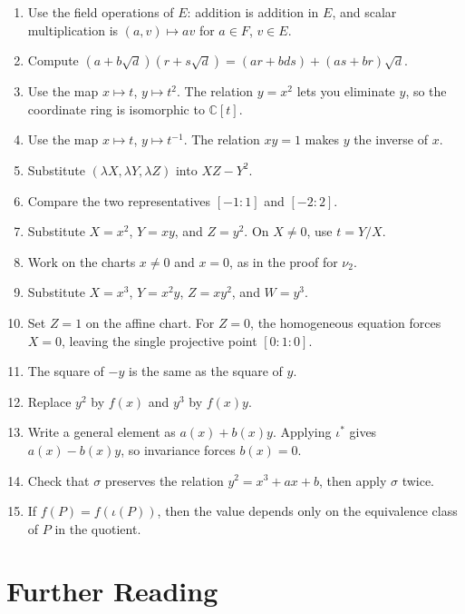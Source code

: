 \documentclass[11pt]{article}
\theoremstyle{definition}
\theoremstyle{remark}
\newcommand{\C}{\mathbb{C}}
\begin{document}
\begin{enumerate}
\item Use the field operations of \(E\): addition is addition in \(E\), and
scalar multiplication is \((a,v)\mapsto av\) for \(a\in F\), \(v\in E\).
\item Compute
\((a+b\sqrt d)(r+s\sqrt d)=(ar+bds)+(as+br)\sqrt d\).
\item Use the map \(x\mapsto t\), \(y\mapsto t^2\).  The relation
\(y=x^2\) lets you eliminate \(y\), so the coordinate ring is isomorphic to
\(\C[t]\).
\item Use the map \(x\mapsto t\), \(y\mapsto t^{-1}\).  The relation
\(xy=1\) makes \(y\) the inverse of \(x\).
\item Substitute \((\lambda X,\lambda Y,\lambda Z)\) into \(XZ-Y^2\).
\item Compare the two representatives \([-1:1]\) and \([-2:2]\).
\item Substitute \(X=x^2\), \(Y=xy\), and \(Z=y^2\).  On \(X\neq 0\), use
\(t=Y/X\).
\item Work on the charts \(x\neq 0\) and \(x=0\), as in the proof for
\(\nu_2\).
\item Substitute \(X=x^3\), \(Y=x^2y\), \(Z=xy^2\), and \(W=y^3\).
\item Set \(Z=1\) on the affine chart.  For \(Z=0\), the homogeneous equation
forces \(X=0\), leaving the single projective point \([0:1:0]\).
\item The square of \(-y\) is the same as the square of \(y\).
\item Replace \(y^2\) by \(f(x)\) and \(y^3\) by \(f(x)y\).
\item Write a general element as \(a(x)+b(x)y\).  Applying \(\iota^*\) gives
\(a(x)-b(x)y\), so invariance forces \(b(x)=0\).
\item Check that \(\sigma\) preserves the relation \(y^2=x^3+ax+b\), then
apply \(\sigma\) twice.
\item If \(f(P)=f(\iota(P))\), then the value depends only on the equivalence
class of \(P\) in the quotient.
\end{enumerate}

\section*{Further Reading}
\end{document}

